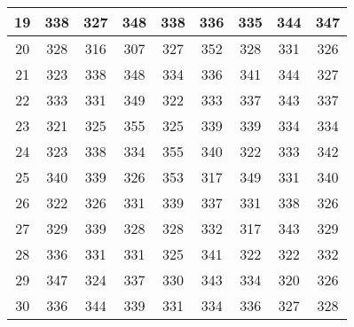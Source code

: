\documentclass[11pt]{article}
\begin{document}
\begin{table}[!h]
\begin{center}
\begin{tabular}{| c | c | c | c | c | c | c | c | c |}
			19 & 338 & 327 & 348 & 338 & 336 & 335 & 344 & 347 \\ \hline
			20 & 328 & 316 & 307 & 327 & 352 & 328 & 331 & 326 \\ \hline
			21 & 323 & 338 & 348 & 334 & 336 & 341 & 344 & 327 \\ \hline
			22 & 333 & 331 & 349 & 322 & 333 & 337 & 343 & 337 \\ \hline
			23 & 321 & 325 & 355 & 325 & 339 & 339 & 334 & 334 \\ \hline
			24 & 323 & 338 & 334 & 355 & 340 & 322 & 333 & 342 \\ \hline
			25 & 340 & 339 & 326 & 353 & 317 & 349 & 331 & 340 \\ \hline
			26 & 322 & 326 & 331 & 339 & 337 & 331 & 338 & 326 \\ \hline
			27 & 329 & 339 & 328 & 328 & 332 & 317 & 343 & 329 \\ \hline
			28 & 336 & 331 & 331 & 325 & 341 & 322 & 322 & 332 \\ \hline
			29 & 347 & 324 & 337 & 330 & 343 & 334 & 320 & 326 \\ \hline
			30 & 336 & 344 & 339 & 331 & 334 & 336 & 327 & 328 \\ \hline
		\end{tabular}
	\end{center}
\end{table}

\pagebreak
\end{document}
